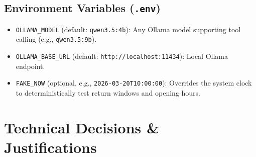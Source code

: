 \documentclass[11pt,a4paper]{article}
\begin{document}
\subsection{Environment Variables (\texttt{.env})}
\begin{itemize}
    \item \texttt{OLLAMA\_MODEL} (default: \texttt{qwen3.5:4b}): Any Ollama model supporting tool calling (e.g., \texttt{qwen3.5:9b}).
    \item \texttt{OLLAMA\_BASE\_URL} (default: \texttt{http://localhost:11434}): Local Ollama endpoint.
    \item \texttt{FAKE\_NOW} (optional, e.g., \texttt{2026-03-20T10:00:00}): Overrides the system clock to deterministically test return windows and opening hours.
\end{itemize}

\section{Technical Decisions \& Justifications}
\end{document}
